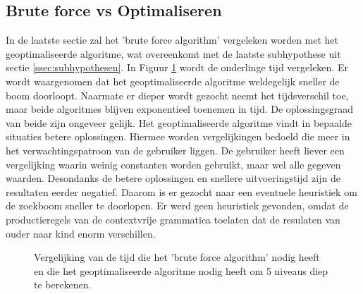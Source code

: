 \documentclass[Main.tex]{subfiles}
\begin{document}
\subsection{Brute force vs Optimaliseren}
In de laatste sectie zal het 'brute force algorithm' vergeleken worden met het geoptimaliseerde algoritme, wat overeenkomt met de laatste subhypothese uit sectie \ref{ssec:subhypothesen}. In Figuur \ref{fig:brutevsopttijd} wordt de onderlinge tijd vergeleken. Er wordt waargenomen dat het geoptimaliseerde algoritme weldegelijk sneller de boom doorloopt. Naarmate er dieper wordt gezocht neemt het tijdsverschil toe, maar beide algoritmes blijven exponentieel toenemen in tijd. De oplossingsgraad van beide zijn ongeveer gelijk. Het geoptimaliseerde algoritme vindt in bepaalde situaties betere oplossingen. Hiermee worden vergelijkingen bedoeld die meer in het verwachtingspatroon van de gebruiker liggen. De gebruiker heeft liever een vergelijking waarin weinig constanten worden gebruikt, maar wel alle gegeven waarden. Desondanks de betere oplossingen en snellere uitvoeringstijd zijn de resultaten eerder negatief. Daarom is er gezocht naar een eventuele heuristiek om de zoekboom sneller te doorlopen. Er werd geen heuristiek gevonden, omdat de productieregels van de contextvrije grammatica toelaten dat de resulaten van ouder naar kind enorm verschillen.


\begin{figure}[!htb]
\centering
{}
\caption{Vergelijking van de tijd die het 'brute force algorithm' nodig heeft en die het geoptimaliseerde algoritme nodig heeft om 5 niveaus diep te berekenen.} \label{fig:brutevsopttijd}
\end{figure}
\end{document}
